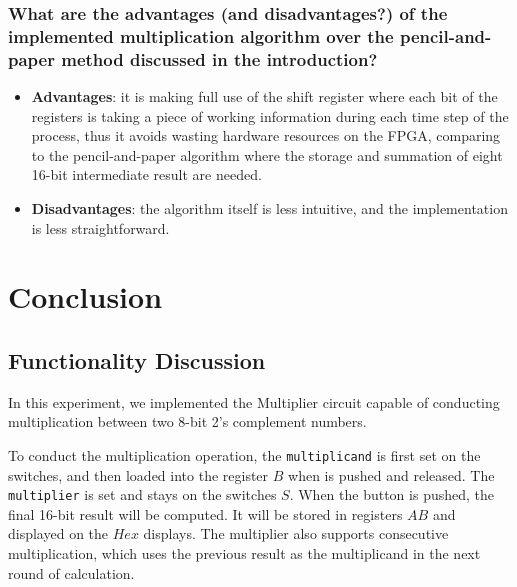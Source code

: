 \documentclass{article}
\begin{document}
\subsubsection{What are the advantages (and disadvantages?) of the implemented multiplication algorithm over the pencil-and-paper method discussed in the introduction?}


\begin{itemize}
    \item \textbf{Advantages}: it is making full use of the shift register where each bit of the registers is taking a piece of working information during each time step of the process, thus it avoids wasting hardware resources on the FPGA, comparing to the pencil-and-paper algorithm where the storage and summation of eight 16-bit intermediate result are needed.
    
    \item \textbf{Disadvantages}: the algorithm itself is less intuitive, and the implementation is less straightforward.
\end{itemize} 


\section{Conclusion}
\subsection{Functionality Discussion}
In this experiment, we implemented the Multiplier circuit capable of conducting multiplication between two 8-bit 2's complement numbers. 

To conduct the multiplication operation, the \texttt{multiplicand} is first set on the switches, and then loaded into the register $B$ when  is pushed and released. The \texttt{multiplier} is set and stays on the switches $S$. When the  button is pushed, the final 16-bit result will be computed. It will be stored in registers $AB$ and displayed on the $Hex$ displays. The multiplier also supports consecutive multiplication, which uses the previous result as the multiplicand in the next round of calculation.
\end{document}
